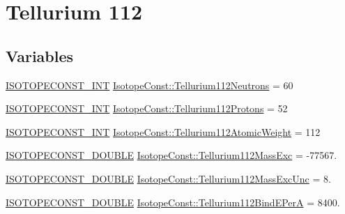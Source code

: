 \hypertarget{group___isotope_const-_tellurium-_te112}{}\section{Tellurium 112}
\label{group___isotope_const-_tellurium-_te112}
\subsection*{Variables}
\begin{DoxyCompactItemize}
\item 
\mbox{\hyperlink{group___isotope_const-_macros_ga5f18360b3e99483a35c32d789e62621c}{I\+S\+O\+T\+O\+P\+E\+C\+O\+N\+S\+T\+\_\+\+I\+NT}} \mbox{\hyperlink{group___isotope_const-_tellurium-_te112_ga7ac9b495809ea6527f44acc67eeead40}{Isotope\+Const\+::\+Tellurium112\+Neutrons}} = 60
\item 
\mbox{\hyperlink{group___isotope_const-_macros_ga5f18360b3e99483a35c32d789e62621c}{I\+S\+O\+T\+O\+P\+E\+C\+O\+N\+S\+T\+\_\+\+I\+NT}} \mbox{\hyperlink{group___isotope_const-_tellurium-_te112_gaa00f1aec145a2af7fcc86823f9684c39}{Isotope\+Const\+::\+Tellurium112\+Protons}} = 52
\item 
\mbox{\hyperlink{group___isotope_const-_macros_ga5f18360b3e99483a35c32d789e62621c}{I\+S\+O\+T\+O\+P\+E\+C\+O\+N\+S\+T\+\_\+\+I\+NT}} \mbox{\hyperlink{group___isotope_const-_tellurium-_te112_ga9754ac99ec1bf8d249b51c4253e75b13}{Isotope\+Const\+::\+Tellurium112\+Atomic\+Weight}} = 112
\item 
\mbox{\hyperlink{group___isotope_const-_macros_ga8f45a7272ce02c0b4c65c44636ed719a}{I\+S\+O\+T\+O\+P\+E\+C\+O\+N\+S\+T\+\_\+\+D\+O\+U\+B\+LE}} \mbox{\hyperlink{group___isotope_const-_tellurium-_te112_gaab869676cf43af198120ce09f91168b5}{Isotope\+Const\+::\+Tellurium112\+Mass\+Exc}} = -\/77567.
\item 
\mbox{\hyperlink{group___isotope_const-_macros_ga8f45a7272ce02c0b4c65c44636ed719a}{I\+S\+O\+T\+O\+P\+E\+C\+O\+N\+S\+T\+\_\+\+D\+O\+U\+B\+LE}} \mbox{\hyperlink{group___isotope_const-_tellurium-_te112_gaada302147b3c5015c7b20c9bf11f8c47}{Isotope\+Const\+::\+Tellurium112\+Mass\+Exc\+Unc}} = 8.
\item 
\mbox{\hyperlink{group___isotope_const-_macros_ga8f45a7272ce02c0b4c65c44636ed719a}{I\+S\+O\+T\+O\+P\+E\+C\+O\+N\+S\+T\+\_\+\+D\+O\+U\+B\+LE}} \mbox{\hyperlink{group___isotope_const-_tellurium-_te112_ga2568fbcfd4074094cc4ea878783e252d}{Isotope\+Const\+::\+Tellurium112\+Bind\+E\+PerA}} = 8400.
\item 

\end{DoxyCompactItemize}
